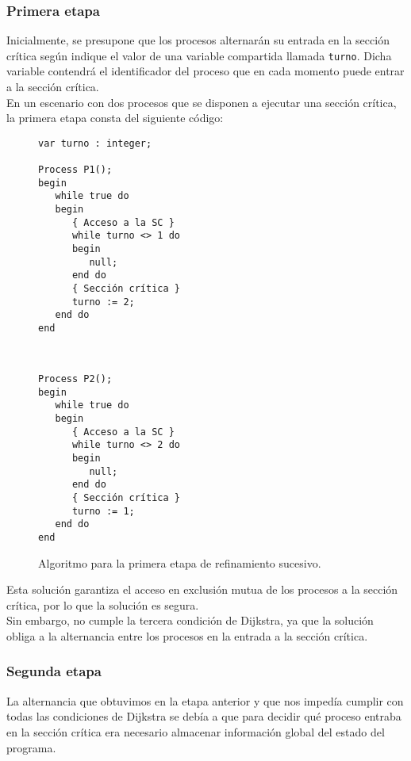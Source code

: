 \subsubsection{Primera etapa}
Inicialmente, se presupone que los procesos alternarán su entrada en la sección crítica según indique el valor de una variable compartida llamada \verb|turno|. Dicha variable contendrá el identificador del proceso que en cada momento puede entrar a la sección crítica.\\

En un escenario con dos procesos que se disponen a ejecutar una sección crítica, la primera etapa consta del siguiente código:

\begin{figure}[H]
    \centering
    \setlength{\columnsep}{1cm}
    \begin{multicols}{2}
\begin{verbatim}
var turno : integer;

Process P1();
begin
   while true do
   begin
      { Acceso a la SC }
      while turno <> 1 do
      begin
         null;
      end do
      { Sección crítica }
      turno := 2;
   end do
end
\end{verbatim}
\begin{verbatim}


Process P2();
begin
   while true do
   begin
      { Acceso a la SC }
      while turno <> 2 do
      begin
         null;
      end do
      { Sección crítica }
      turno := 1;
   end do
end
\end{verbatim}
\end{multicols}
\caption{Algoritmo para la primera etapa de refinamiento sucesivo.}
\end{figure}


Esta solución garantiza el acceso en exclusión mutua de los procesos a la sección crítica, por lo que la solución es segura.\\

Sin embargo, no cumple la tercera condición de Dijkstra, ya que la solución obliga a la alternancia entre los procesos en la entrada a la sección crítica. 

\subsubsection{Segunda etapa}
La alternancia que obtuvimos en la etapa anterior y que nos impedía cumplir con todas las condiciones de Dijkstra se debía a que para decidir qué proceso entraba en la sección crítica era necesario almacenar información global del estado del programa.

